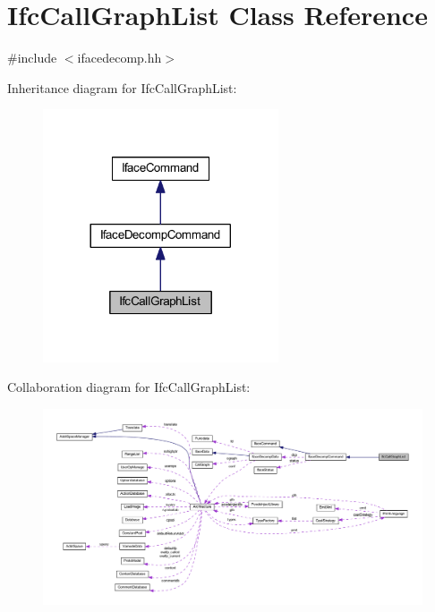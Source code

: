 \hypertarget{class_ifc_call_graph_list}{}\section{Ifc\+Call\+Graph\+List Class Reference}
\label{class_ifc_call_graph_list}


{\ttfamily \#include $<$ifacedecomp.\+hh$>$}



Inheritance diagram for Ifc\+Call\+Graph\+List\+:
\nopagebreak
\begin{figure}[H]
\begin{center}
\leavevmode
\includegraphics[width=197pt]{class_ifc_call_graph_list__inherit__graph}
\end{center}
\end{figure}


Collaboration diagram for Ifc\+Call\+Graph\+List\+:
\nopagebreak
\begin{figure}[H]
\begin{center}
\leavevmode
\includegraphics[width=350pt]{class_ifc_call_graph_list__coll__graph}
\end{center}
\end{figure}
